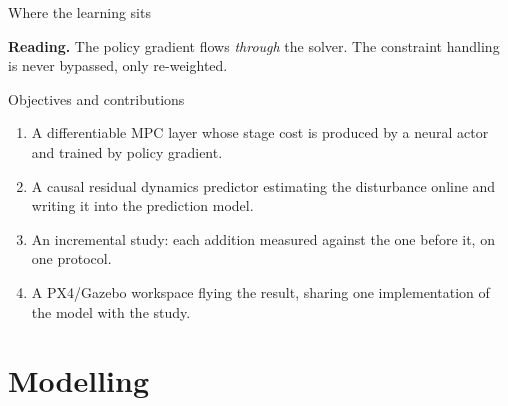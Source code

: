 \documentclass[10pt]{beamer}
\newcommand{\takeaway}[1]{\par\vfill{\footnotesize\textbf{Reading.} #1\par}}
\begin{document}
\begin{frame}{Where the learning sits}
  \centering
  \takeaway{The policy gradient flows \emph{through} the solver. The
    constraint handling is never bypassed, only re-weighted.}
\end{frame}

\begin{frame}{Objectives and contributions}
  \begin{enumerate}
    \item A differentiable MPC layer whose stage cost is produced by a neural
      actor and trained by policy gradient.
    \item A causal residual dynamics predictor estimating the disturbance
      online and writing it into the prediction model.
    \item An incremental study: each addition measured against the one before
      it, on one protocol.
    \item A PX4/Gazebo workspace flying the result, sharing one
      implementation of the model with the study.
  \end{enumerate}
\end{frame}

\section{Modelling}
\end{document}
